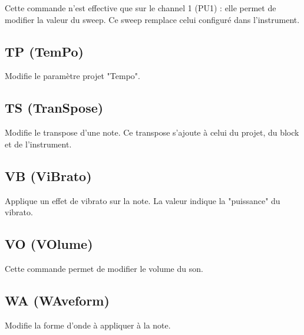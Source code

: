 Cette commande n'est effective que sur le channel 1 (PU1) : elle permet de modifier la valeur du sweep.
Ce sweep remplace celui configuré dans l'instrument.

\subsection{TP (TemPo)}


Modifie le paramètre projet "Tempo".

\subsection{TS (TranSpose)}


Modifie le transpose d'une note. Ce transpose s'ajoute à celui du projet, du block et de l'instrument.

\subsection{VB (ViBrato)}


Applique un effet de vibrato sur la note. La valeur indique la "puissance" du vibrato.

\subsection{VO (VOlume)}


Cette commande permet de modifier le volume du son.

\subsection{WA (WAveform)}


Modifie la forme d'onde à appliquer à la note.
